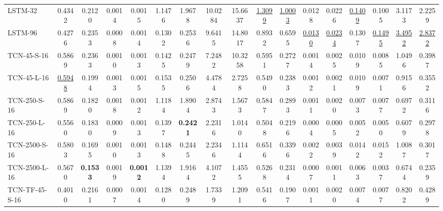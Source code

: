 \begin{table*}[h]
{\begin{tabular}{lcc|cc|cc|cc|cc|cc|cc|cc}
            \midrule
            LSTM-32 
                & 0.4342 & 0.2120
                & 0.0014 & 0.0015 & 1.1476 & 1.9678 & 10.0284 & 15.6637 
                & \underline{1.3099} & \underline{1.0003}
                & 0.0128 & 0.0226 & \underline{0.1409} & 0.1005 & 3.1173 & 2.2259\\ 
            LSTM-96 
                & 0.4276 & 0.2353
                & 0.0008 & 0.0014 & 0.1302 & 0.2536 & 9.6415 & 14.8017 
                & 0.8932 & 0.6595
                & \underline{0.0130} & \underline{0.0234} & 0.1307 & \underline{0.1495} & \underline{3.4952} & \underline{2.8372}\\ 
            \midrule
            TCN-45-S-16 
                & 0.5869 & 0.2363
                & 0.0010 & 0.0013 & 0.1425 & 0.2479 & 7.2482 & 10.3258 
                & 0.5951 & 0.2727
                & 0.0014 & 0.0025 & 0.0109 & 0.0085 & 1.0496 & 0.3987\\ 
            TCN-45-L-16 
                & \underline{0.5948} & 0.1994
                & 0.0013 & 0.0015 & 0.1535 & 0.2506 & 4.4784 & 2.7258 
                & 0.5490 & 0.2383
                & 0.0012 & 0.0021 & 0.0109 & 0.0071 & 0.9156 & 0.3552\\ 
            TCN-250-S-16 
                & 0.5869 & 0.1820
                & 0.0018 & 0.0012 & 1.1184 & 1.8904 & 2.8743 & 1.5673 
                & 0.5847 & 0.2893
                & 0.0011 & 0.0020 & 0.0073 & 0.0077 & 0.6972 & 0.3116\\ 
            TCN-250-L-16 
                &0.5560 & 0.1830
                & 0.0009 & 0.0013 & 0.1397 & \textbf{0.2421} & 2.2316 & 1.0140 
                & 0.5048 & 0.2196
                & 0.0004 & 0.0005 & 0.0052 & 0.0050 & 0.6079 & 0.2978\\ 
            TCN-2500-S-16 
                & 0.5803 & 0.1695
                & 0.0010 & 0.0013 & 0.1488 & 0.2445 & 2.2346 & 1.1144 
                & 0.6516 & 0.3396
                & 0.0022 & 0.0039 & 0.0142 & 0.0152 & 1.0087 & 0.3017\\ 
            TCN-2500-L-16 
                & 0.5670 & \textbf{0.1533}
                & 0.0019 & \textbf{0.0012} & 1.1394 & 1.9164 & 4.1072 & 1.4555 
                & 0.5268 & 0.2314
                & 0.0007 & 0.0011 & 0.0063 & 0.0037 & 0.6744 & 0.2359\\ 
            \midrule
            TCN-TF-45-S-16 
                & 0.4010 & 0.2161
                & 0.0007 & 0.0014 & 0.1280 & 0.2489 & 1.7339 & 1.2091 
                & 0.5416 & 0.1907
                & 0.0011 & 0.0020 & 0.0074 & 0.0077 & 0.8202 & 0.4289\\ 

\end{tabular}}
\end{table*}
